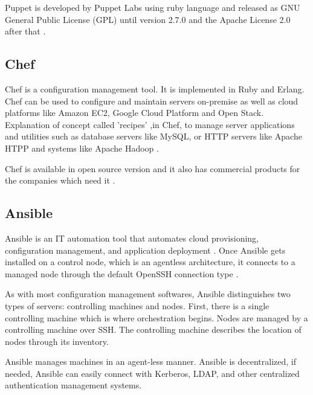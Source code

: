 {     Puppet is developed by Puppet Labs
     using ruby language and released as GNU General Public License
     (GPL) until version 2.7.0 and the Apache License 2.0 after
     that \cite{www-puppet-wiki-puppet}.

     \pv
	
\subsection{Chef}

     Chef is a configuration management tool. It is implemented in
     Ruby and Erlang. Chef can be used to configure and maintain
     servers on-premise as well as cloud platforms like Amazon EC2,
     Google Cloud Platform and Open Stack. Explanation of concept called
     'recipes' ,in Chef, to manage server applications and utilities such as database
     servers like MySQL, or HTTP servers like Apache HTPP and systems
     like Apache Hadoop \cite{chef-book}.

     Chef is available in open source version and it also has
     commercial products for the companies which need it
     \cite{www-chef-commercial}.

     \pv

\subsection{Ansible}

     Ansible is an IT automation tool that automates cloud
     provisioning, configuration management, and application
     deployment \cite{www-ansible}. Once Ansible gets installed on a
     control node, which is an agentless architecture, it connects to
     a managed node through the default OpenSSH connection
     type \cite{www-ansible-wikipedia}.

     As with most configuration management softwares, Ansible
     distinguishes two types of servers: controlling machines and
     nodes. First, there is a single controlling machine which is
     where orchestration begins. Nodes are managed by a controlling
     machine over SSH. The controlling machine describes the location
     of nodes through its inventory.

     Ansible manages machines in an agent-less manner. Ansible is
     decentralized, if needed, Ansible can easily connect with
     Kerberos, LDAP, and other centralized authentication management
     systems.

     \pv

}
